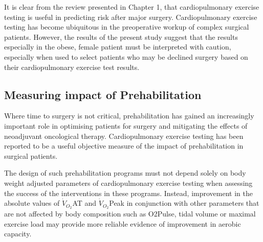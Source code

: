 It is clear from the review presented in Chapter 1, that cardiopulmonary exercise testing is useful in predicting risk after major surgery. Cardiopulmonary exercise testing has become ubiquitous in the preoperative workup of complex surgical patients. However, the results of the present study suggest that the results especially in the obese, female patient must be interpreted with caution, especially when used to select patients who may be declined surgery based on their cardiopulmonary exercise test results.

\subsection{Measuring impact of Prehabilitation}

Where time to surgery is not critical, prehabilitation has gained an increasingly important role in optimising patients for surgery and mitigating the effects of neoadjuvant oncological therapy. Cardiopulmonary exercise testing has been reported to be a useful objective measure of the impact of prehabilitation in surgical patients.\parencite{west_effect_2015}

The design of such prehabilitation programs must not depend solely on body weight adjusted parameters of cardiopulmonary exercise testing when assessing the success of the interventions in these programs. Instead, improvement in the absolute values of $\dot{V}_{O_2}$AT and $\dot{V}_{O_2}$Peak in conjunction with other parameters that are not affected by body composition such as O2Pulse, tidal volume\parencite{jones_effects_2007} or maximal exercise load may provide more reliable evidence of improvement in aerobic capacity.















